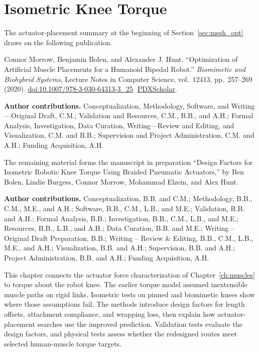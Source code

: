 \chapter{Isometric Knee Torque}\label{ch:torque}\label{ch:results}
\graphicspath{{../Figures/30-torque/}{figs/30-torque/}}

{\doublespacing\normalsize\upshape
\noindent The actuator-placement summary at the beginning of Section~\ref{sec:mesh_opt} draws on the following publication.\par
\noindent Connor Morrow, Benjamin Bolen, and Alexander J. Hunt. ``Optimization of Artificial Muscle Placements for a Humanoid Bipedal Robot.'' \emph{Biomimetic and Biohybrid Systems}, Lecture Notes in Computer Science, vol.~12413, pp.~257--269 (2020). \href{https://doi.org/10.1007/978-3-030-64313-3_25}{doi:10.1007/978-3-030-64313-3\_25}. \href{https://pdxscholar.library.pdx.edu/mengin_fac/368/}{PDXScholar}.\nocite{morrow_optimization_2020}\par
\noindent\textbf{Author contributions.} Conceptualization, Methodology, Software, and Writing---Original Draft, C.M.; Validation and Resources, C.M., B.B., and A.H.; Formal Analysis, Investigation, Data Curation, Writing---Review and Editing, and Visualization, C.M. and B.B.; Supervision and Project Administration, C.M. and A.H.; Funding Acquisition, A.H.\par
\medskip
\noindent The remaining material forms the manuscript in preparation ``Design Factors for Isometric Robotic Knee Torque Using Braided Pneumatic Actuators,'' by Ben Bolen, Lindie Burgess, Connor Morrow, Mohammad Elzein, and Alex Hunt.\nocite{bolen_isometric_2025}\par
\noindent\textbf{Author contributions.} Conceptualization, B.B. and C.M.; Methodology, B.B., C.M., M.E., and A.H.; Software, B.B., C.M., L.B., and M.E.; Validation, B.B. and A.H.; Formal Analysis, B.B.; Investigation, B.B., C.M., L.B., and M.E.; Resources, B.B., L.B., and A.H.; Data Curation, B.B. and M.E.; Writing -- Original Draft Preparation, B.B.; Writing -- Review \& Editing, B.B., C.M., L.B., M.E., and A.H.; Visualization, B.B. and A.H.; Supervision, B.B. and A.H.; Project Administration, B.B. and A.H.; Funding Acquisition, A.H.\par}
\clearpage

This chapter connects the actuator force characterization of Chapter~\ref{ch:muscles} to torque about the robot knee. The earlier torque model assumed inextensible muscle paths on rigid links. Isometric tests on pinned and biomimetic knees show where those assumptions fail. The methods introduce design factors for length offsets, attachment compliance, and wrapping loss, then explain how actuator-placement searches use the improved prediction. Validation tests evaluate the design factors, and physical tests assess whether the redesigned routes meet selected human-muscle torque targets.

